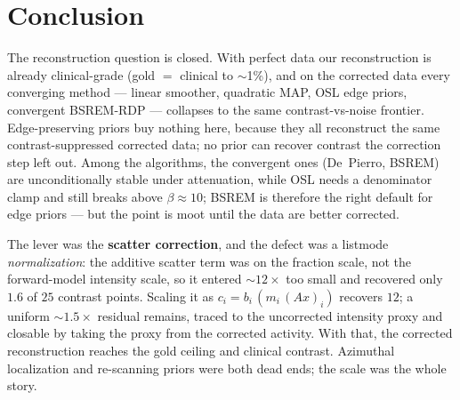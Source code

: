 \documentclass[11pt]{article}
\begin{document}
\section{Conclusion}
The reconstruction question is closed. With perfect data our reconstruction is already
clinical-grade (gold $=$ clinical to $\sim$1\%), and on the corrected data every
converging method --- linear smoother, quadratic MAP, OSL edge priors, convergent
BSREM-RDP --- collapses to the same contrast-vs-noise frontier. Edge-preserving priors
buy nothing here, because they all reconstruct the same contrast-suppressed corrected
data; no prior can recover contrast the correction step left out. Among the algorithms,
the convergent ones (De~Pierro, BSREM) are unconditionally stable under attenuation,
while OSL needs a denominator clamp and still breaks above $\beta\!\approx\!10$; BSREM is
therefore the right default for edge priors --- but the point is moot until the data are
better corrected.

The lever was the \textbf{scatter correction}, and the defect was a listmode
\emph{normalization}: the additive scatter term was on the fraction scale, not the
forward-model intensity scale, so it entered $\sim\!12\times$ too small and recovered only
$1.6$ of $25$ contrast points. Scaling it as $c_i = b_i\,(m_i\,(Ax)_i)$ recovers $12$; a
uniform $\sim\!1.5\times$ residual remains, traced to the uncorrected intensity proxy and
closable by taking the proxy from the corrected activity. With that, the corrected
reconstruction reaches the gold ceiling and clinical contrast. Azimuthal localization and
re-scanning priors were both dead ends; the scale was the whole story.
\end{document}
